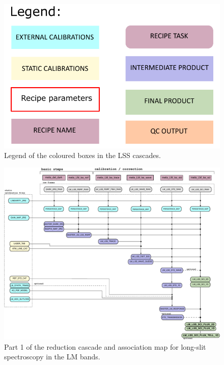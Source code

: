\begin{figure}[ht]
  \centering
  \includegraphics[width=0.4\textheight]{figures/legend.pdf}
  \caption[Legend]{Legend of the coloured boxes in the \ac{LSS} cascades.}
  \label{Fig:LSScascadelegend}
\end{figure}
\clearpage


\begin{landscape}
\begin{figure}[ht]
  \centering
  \includegraphics{figures/LM_LSS_pipeline_wf_draft_latest_part_1_v0.83.pdf}
  \caption[Reduction cascade and association map for LM long-slit
  spectroscopy]{Part 1 of the reduction cascade and association map for long-slit
    spectroscopy in the LM bands.}
  \label{Fig:LMLssAssomap1}
\end{figure}
\end{landscape}

